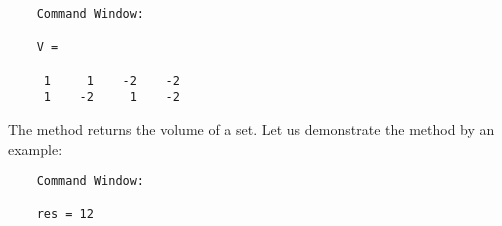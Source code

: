 \begin{center}
\begin{minipage}[t]{0.3\textwidth}
	\vspace{10pt}
	\footnotesize
	
\end{minipage}
\begin{minipage}[t]{0.32\textwidth}
	\vspace{10pt}

	\begin{verbatim}
	Command Window:
		
	V =

     1     1    -2    -2
     1    -2     1    -2
	\end{verbatim}
\end{minipage}
\begin{minipage}[t]{0.3\textwidth}
	\vspace{0pt}
	\centering
\end{minipage}
\end{center}




The method  returns the volume of a set. Let us demonstrate the method  by an example:

\begin{center}
\begin{minipage}[t]{0.4\textwidth}
	\vspace{10pt}
	\footnotesize
	
\end{minipage}
\begin{minipage}[t]{0.2\textwidth}
	\vspace{10pt}

	\begin{verbatim}
	Command Window:
		
	res = 12
	\end{verbatim}
\end{minipage}
\begin{minipage}[t]{0.3\textwidth}
	\vspace{0pt}
	\centering
\end{minipage}
\end{center}
